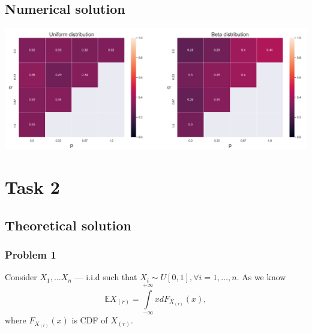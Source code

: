 \documentclass[a4paper, 12pt]{article}
\begin{document}
\subsection{Numerical solution}
\includegraphics[scale=0.4]{"Images/Task1.png"}


\section{Task 2}
\subsection{Theoretical solution}
\subsubsection{Problem 1}
Consider $X_1, \ldots X_n$ --- i.i.d such that $X_i \sim U[0, 1], \forall i = 1, \ldots, n.$
As we know
$$
\mathbb{E} X_{(r)} = \int \limits_{-\infty}^{+\infty} x d F_{X_{(r)}}(x),
$$
where $F_{X_{(r)}}(x)$ is CDF of $X_{(r)}.$
\end{document}
